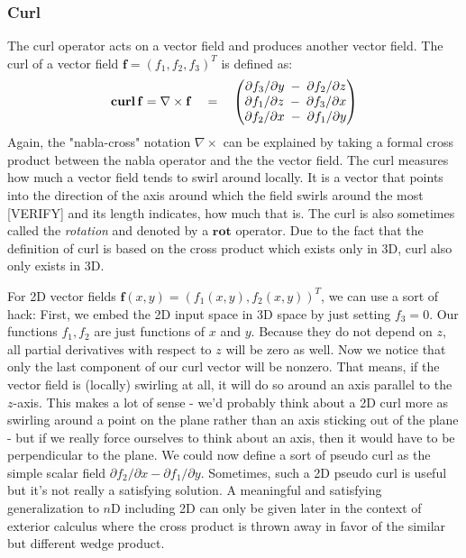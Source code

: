 \subsubsection{Curl}
The curl operator acts on a vector field and produces another vector field. The curl of a vector field $\mathbf{f} = (f_1, f_2, f_3)^T$ is defined as:
\begin{equation}
 \operatorname{\mathbf{curl}} \mathbf{f} = \nabla \times \mathbf{f}  \quad = \quad
 \begin{pmatrix}
	\partial f_3 / \partial y \; - \; \partial f_2 / \partial z \\
	\partial f_1 / \partial z \; - \; \partial f_3 / \partial x \\
	\partial f_2 / \partial x \; - \; \partial f_1 / \partial y
\end{pmatrix} 
\end{equation}
Again, the "nabla-cross" notation  $\nabla \times$ can be explained by taking a formal cross product between the nabla operator and the the vector field. The curl measures how much a vector field tends to swirl around locally. It is a vector that points into the direction of the axis around which the field swirls around the most [VERIFY] and its length indicates, how much that is. The curl is also sometimes called the \emph{rotation} and denoted by a $\mathbf{rot}$ operator. Due to the fact that the definition of curl is based on the cross product which exists only in 3D, curl also only exists in 3D. 

\medskip
For 2D vector fields $\mathbf{f}(x,y) = (f_1(x,y), f_2(x,y))^T$, we can use a sort of hack: First, we embed the 2D input space in 3D space by just setting $f_3 = 0$. Our functions $f_1, f_2$ are just functions of $x$ and $y$.  Because they do not depend on $z$, all partial derivatives with respect to $z$ will be zero as well. Now we notice that only the last component of our curl vector will be nonzero. That means, if the vector field is (locally) swirling at all, it will do so around an axis parallel to the $z$-axis. This makes a lot of sense - we'd probably think about a 2D curl more as swirling around a point on the plane rather than an axis sticking out of the plane - but if we really force ourselves to think about an axis, then it would have to be perpendicular to the plane. We could now define a sort of pseudo curl as the simple scalar field $\partial f_2 / \partial x - \partial f_1 / \partial y$. Sometimes, such a 2D pseudo curl is useful but it's not really a satisfying solution. A meaningful and satisfying generalization to $n$D including 2D can only be given later in the context of exterior calculus where the cross product is thrown away in favor of the similar but different wedge product. 

